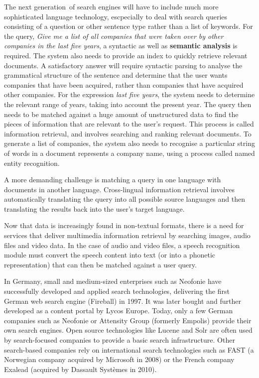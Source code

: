 \documentclass[]{../../metanetpaper}
\begin{document}
\begin{Parallel}[c]{79mm}{78mm}
{The next generation\ of search engines will have to include much more sophisticated language technology, escpecially to 
deal with search queries consisting of a question or other sentence type rather than a list of keywords. For the query, \textit{Give me a list of 
all companies that were taken over by other companies in the last five years}, a syntactic as well as \textbf{semantic analysis} is required. The system also needs to provide an index to quickly retrieve relevant documents. A satisfactory answer will require 
syntactic parsing to analyse the grammatical structure of the sentence and determine that the user wants companies that have been 
acquired, rather than companies that have acquired other companies. For the expression \textit{last five years}, the system needs to determine the 
relevant range of years, taking into account the present year. The query then needs to be matched against a huge amount of unstructured data to find the pieces of information that are relevant to the user’s request. This process is called information retrieval, and involves searching and ranking relevant documents. To generate a list of companies, the system also needs to recognise a particular string of words in a document represents a company name, using a process called named entity recognition.

A more demanding challenge is matching a query in one language with documents in another language. Cross-lingual information retrieval 
involves automatically translating the query into all possible source languages and then translating the results back into the user's target 
language. 

Now that data is increasingly found in non-textual formats, there is a need for services that deliver multimedia information retrieval 
by searching images, audio files and video data. In the case of audio and video files, a speech recognition module must convert the 
speech content into text (or into a phonetic representation) that can then be matched against a user query.

In Germany, small and medium-sized enterprises such as Neofonie have successfully developed and applied search technologies, delivering the first German web search engine (Fireball) in 1997. It was later bought and further developed as a content portal by Lycos Europe. Today, only a few German companies such as Neofonie or Attensity Group (formerly Empolis) provide their own search engines. Open source technologies like Lucene and Solr are often used by search-focused companies to provide a basic search infrastructure. Other search-based companies rely on international search technologies such as FAST (a Norwegian company acquired by Microsoft in 2008) or the French company Exalead (acquired by Dassault Systèmes in 2010).

}
\end{Parallel}
\end{document}
